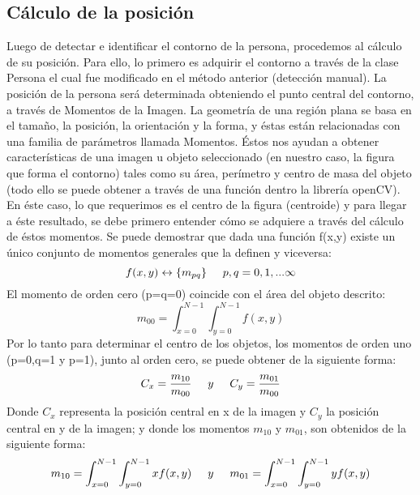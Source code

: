 \documentclass[a4paper,openright,12pt]{report}
\begin{document}
\subsection{Cálculo de la posición}
Luego de detectar e identificar el contorno de la persona, procedemos al cálculo de su posición. Para ello, lo primero es adquirir el contorno a través de la clase Persona el cual fue modificado en el método anterior (detección manual). La posición de la persona será determinada obteniendo el punto central del contorno, a través de Momentos de la Imagen. La geometría de una región plana se basa en el tamaño, la posición, la orientación y la forma, y éstas están relacionadas con una familia de parámetros llamada Momentos. Éstos nos ayudan a obtener características de una imagen u objeto seleccionado (en nuestro caso, la figura que forma el contorno) tales como su área, perímetro y centro de masa del objeto (todo ello se puede obtener a través de una función dentro la librería openCV).\\
En éste caso, lo que requerimos es el centro de la figura (centroide) y para llegar a éste resultado, se debe primero entender cómo se adquiere a través del cálculo de éstos momentos. Se puede demostrar que dada una función f(x,y) existe un único conjunto de momentos generales que la definen y viceversa:\\ 
\begin{equation}
	f(x,y) \leftrightarrow \{m_{pq}\} \hspace*{5mm} p,q = 0,1,...\infty
\end{equation} 
El momento de orden cero (p=q=0) coincide con el área del objeto descrito:\\
\begin{equation}
m_{00} = \int_{x=0}^{N-1} \int_{y=0}^{N-1} f(x,y)
\end{equation}
Por lo tanto para determinar el centro de los objetos, los momentos de orden uno (p=0,q=1 y p=1), junto al orden cero, se puede obtener de la siguiente forma: 
\begin{equation}
C_x = \frac{m_{10}}{m_{00}} \hspace*{5mm}y\hspace*{5mm} C_y = \frac{m_{01}}{m_{00}}
\end{equation}
Donde $C_x$ representa la posición central en x de la imagen y $C_y$ la posición central en y de la imagen; y donde los momentos $m_{10}$ y $m_{01}$, son obtenidos de la siguiente forma:
\begin{equation}
m_{10} = \int_{x=0}^{N-1} \int_{y=0}^{N-1}xf(x,y)\hspace*{5mm}y\hspace*{5mm} m_{01} = \int_{x=0}^{N-1} \int_{y=0}^{N-1}yf(x,y)
\end{equation}
\end{document}
